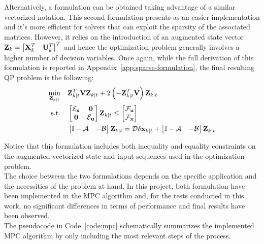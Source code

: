 \documentclass[../main.tex]{subfiles}
\begin{document}
Alternatively, a  formulation can be obtained taking advantage of a
similar vectorized notation. This second formulation presents as an easier
implementation and it's more efficient for solvers that can exploit the sparsity
of the associated matrices.
	However, it relies on the introduction of an augmented state vector
	$\mathbf{Z}_k = \begin{bmatrix} \mathbf{X}_k^T & \mathbf{U}_k^T \end{bmatrix}^T$ and
	hence the optimization problem generally involves a higher number of
	decision variables. Once again, while the full derivation of this
	formulation is reported in Appendix~\ref{app:sparse-formulation}, the final resulting QP problem is the following:
\begin{equation}\label{sparse-formulation}
	\begin{aligned}
		\min_{\mathbf{Z}_{k | t}} \quad & \mathbf{Z}_{k | t}^T \mathbf{V} \mathbf{Z}_{k | t}
		+ 2 \left(- 
		\bar{\mathbf{Z}}_{k | t}^T \mathbf{V} \right) \mathbf{Z}_{k | t}\\
		\text{s.t.} \quad & 
		\begin{bmatrix}
			\mathcal{E}_{\mathbf{x}} & \mathbf{0}\\
			\mathbf{0} & \mathcal{E}_{\mathbf{u}}
		\end{bmatrix} \mathbf{Z}_{k | t} \leq
		\begin{bmatrix}
			\mathcal{F}_{\mathbf{u}}\\
			\mathcal{F}_{\mathbf{x}}
		\end{bmatrix}\\
						  & 
		\begin{bmatrix}
			\mathbb{I} - \mathcal{A} & -\mathcal{B}\\
		\end{bmatrix} \mathbf{Z}_{k | t} = \mathcal{D} \delta \mathbf{x}_{k | t}
		+ \begin{bmatrix}
			\mathbb{I} - \mathcal{A} & -\mathcal{B}\\
		\end{bmatrix} \bar{\mathbf{Z}}_{k | t}
		\end{aligned}
\end{equation}

Notice that this formulation includes both inequality and equality constraints
on the augmented vectorized state and input sequences used in the optimization
problem.\\
The choice between the two formulations depends on the specific application and
the necessities of the problem at hand. In this project, both formulation have
been implemented in the MPC algorithm and, for the tests conducted in this work,
no significant differences in terms of performance and final results have been
observed.\\
The pseudocode in Code~\ref{code:mpc} schematically summarizes the
implemented MPC algorithm by only including the most relevant steps of the
process.
\end{document}
